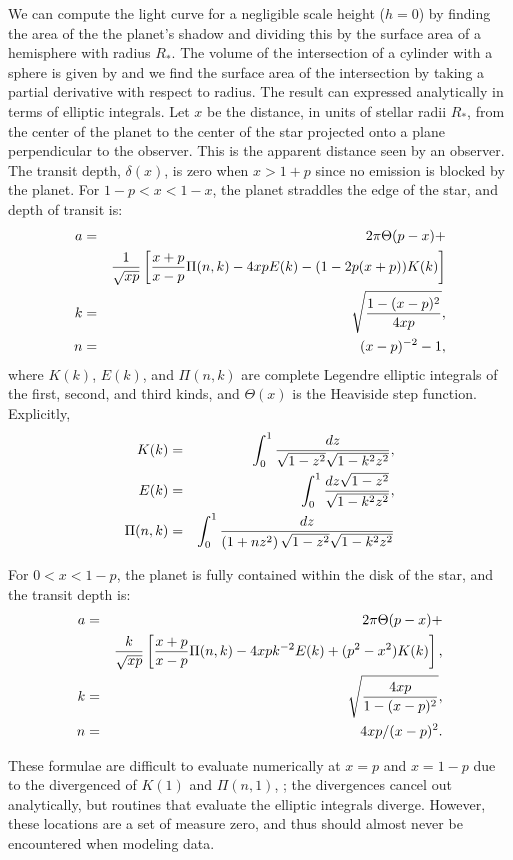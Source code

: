 \documentclass[manuscript]{aastex}
\begin{document}
We can compute the light curve for a negligible scale height ($h=0$) by finding the area of the the planet's shadow and dividing this by the surface area of a hemisphere with radius $R_*$. The volume of the intersection of a cylinder with a sphere is given by \citet{lamarche} and we find the surface area of the intersection by taking a partial derivative with respect to radius. The result can expressed analytically in terms of elliptic integrals.
Let $x$ be the distance, in units of stellar radii $R_*$, from the center of the planet to the center of the star projected onto a plane perpendicular to the observer. This is the apparent distance seen by an observer. 
The transit depth, $\delta (x)$, is zero when $x > 1 + p$ since no emission is blocked by the planet.
For $1-p < x < 1-x$, the planet straddles the edge of the star, and
depth of transit is:
\begin{eqnarray}\label{ingress}
a&=&2\pi\Theta(p-x) +\\
&& {1\over \sqrt{xp}} \left[{x+p\over x-p}\Pi(n,k)-4xpE(k)-(1-2p(x+p))K(k)\right] \cr
k&=&\sqrt{1-(x-p)^2\over 4xp}, \cr 
n&=&(x-p)^{-2}-1,
\end{eqnarray}
where $K(k)$, $E(k)$, and $\Pi(n,k)$ are complete Legendre elliptic 
integrals of the first, second, and third kinds, and $\Theta(x)$ is
the Heaviside step function. Explicitly,
\begin{eqnarray}\label{ellipint}
K(k)&=&\int^1_0 {dz \over \sqrt{1-z^2}\sqrt{1-k^2 z^2}}, \cr
E(k)&=&\int^1_0 {dz \sqrt{1-z^2} \over \sqrt{1-k^2 z^2} }, \cr
\Pi(n,k)&=&\int^1_0 {dz \over \left( 1+n z^2 \right) \sqrt{1-z^2} \sqrt{1-k^2 z^2} }
\end{eqnarray}

For $0 < x < 1-p$, the planet is fully contained within the disk of the star,
and the transit depth is:
\begin{eqnarray}\label{disk}
a&=&2\pi\Theta(p-x)+\\
&&{k\over \sqrt{xp}}\left[{x+p\over x-p}\Pi(n,k)-4xpk^{-2}E(k)
             +(p^2-x^2)K(k)\right],\cr
k&=&\sqrt{4xp\over 1-(x-p)^2},\cr
n&=&4xp/(x-p)^2.
\end{eqnarray}

These formulae are difficult to evaluate numerically at 
$x=p$ and $x=1-p$ due to the divergenced of $K(1)$ and $\Pi(n,1)$,
; the divergences cancel out analytically, but routines that
evaluate the elliptic integrals diverge.  However, these locations
are a set of measure zero, and thus should almost never be encountered
when modeling data.
\end{document}
